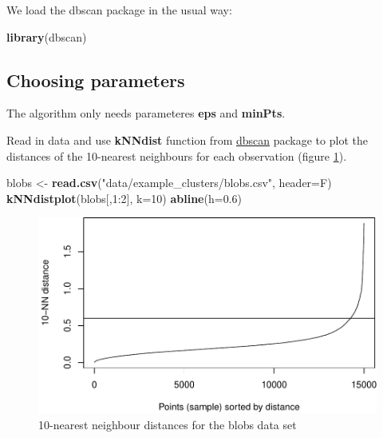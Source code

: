 \documentclass[]{book}
\newenvironment{Shaded}{\begin{snugshade}}{\end{snugshade}}
\newcommand{\KeywordTok}[1]{\textcolor[rgb]{0.13,0.29,0.53}{\textbf{{#1}}}}
\newcommand{\DataTypeTok}[1]{\textcolor[rgb]{0.13,0.29,0.53}{{#1}}}
\newcommand{\DecValTok}[1]{\textcolor[rgb]{0.00,0.00,0.81}{{#1}}}
\newcommand{\FloatTok}[1]{\textcolor[rgb]{0.00,0.00,0.81}{{#1}}}
\newcommand{\StringTok}[1]{\textcolor[rgb]{0.31,0.60,0.02}{{#1}}}
\newcommand{\NormalTok}[1]{{#1}}
\theoremstyle{definition}
\theoremstyle{definition}
\theoremstyle{definition}
\theoremstyle{remark}
\begin{document}
We load the dbscan package in the usual way:

\begin{Shaded}
\begin{Highlighting}[]
\KeywordTok{library}\NormalTok{(dbscan)}
\end{Highlighting}
\end{Shaded}

\subsection{Choosing parameters}\label{choosing-parameters}

The algorithm only needs parameteres \textbf{eps} and \textbf{minPts}.

Read in data and use \textbf{kNNdist} function from
\href{https://cran.r-project.org/package=dbscan}{dbscan} package to plot
the distances of the 10-nearest neighbours for each observation (figure
\ref{fig:blobsKNNdist}).

\begin{Shaded}
\begin{Highlighting}[]
\NormalTok{blobs <-}\StringTok{ }\KeywordTok{read.csv}\NormalTok{(}\StringTok{"data/example_clusters/blobs.csv"}\NormalTok{, }\DataTypeTok{header=}\NormalTok{F)}
\KeywordTok{kNNdistplot}\NormalTok{(blobs[,}\DecValTok{1}\NormalTok{:}\DecValTok{2}\NormalTok{], }\DataTypeTok{k=}\DecValTok{10}\NormalTok{)}
\KeywordTok{abline}\NormalTok{(}\DataTypeTok{h=}\FloatTok{0.6}\NormalTok{)}
\end{Highlighting}
\end{Shaded}

\begin{figure}

{\centering \includegraphics[width=0.75\linewidth]{09-clustering_files/figure-latex/blobsKNNdist-1} 

}

\caption{10-nearest neighbour distances for the blobs data set}\label{fig:blobsKNNdist}
\end{figure}
\end{document}
